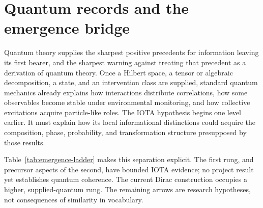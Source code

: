 \section{Quantum records and the emergence bridge}

Quantum theory supplies the sharpest positive precedents for information
leaving its first bearer, and the sharpest warning against treating that
precedent as a derivation of quantum theory.  Once a Hilbert space, a tensor or
algebraic decomposition, a state, and an intervention class are supplied,
standard quantum mechanics already explains how interactions distribute
correlations, how some observables become stable under environmental
monitoring, and how collective excitations acquire particle-like roles.  The
IOTA hypothesis begins one level earlier.  It must explain how its local
informational distinctions could acquire the composition, phase, probability,
and transformation structure presupposed by those results.

Table~\ref{tab:emergence-ladder} makes this separation explicit.  The first
rung, and precursor aspects of the second, have bounded IOTA evidence; no
project result yet establishes quantum coherence.  The current Dirac
construction occupies a higher, supplied-quantum rung.  The remaining arrows
are research hypotheses, not consequences of similarity in vocabulary.

